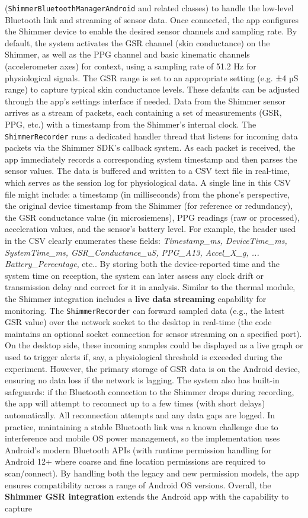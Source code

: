 (\texttt{ShimmerBluetoothManagerAndroid} and related classes) to handle the low-level Bluetooth link and streaming of sensor data. Once connected, the app configures the Shimmer device to enable the desired sensor channels and sampling rate. By default, the system activates the GSR channel (skin conductance) on the Shimmer, as well as the PPG channel and basic kinematic channels (accelerometer axes) for context, using a sampling rate of 51.2 Hz for physiological signals. The GSR range is set to an appropriate setting (e.g. ±4 µS range) to capture typical skin conductance levels. These defaults can be adjusted through the app's settings interface if needed. Data from the Shimmer sensor arrives as a stream of packets, each containing a set of measurements (GSR, PPG, etc.) with a timestamp from the Shimmer's internal clock. The \texttt{ShimmerRecorder} runs a dedicated handler thread that listens for incoming data packets via the Shimmer SDK's callback system. As each packet is received, the app immediately records a corresponding system timestamp and then parses the sensor values. The data is buffered and written to a CSV text file in real-time, which serves as the session log for physiological data. A single line in this CSV file might include: a timestamp (in milliseconds) from the phone's perspective, the original device timestamp from the Shimmer (for reference or redundancy), the GSR conductance value (in microsiemens), PPG readings (raw or processed), acceleration values, and the sensor's battery level. For example, the header used in the CSV clearly enumerates these fields: \textit{Timestamp_ms, DeviceTime_ms, SystemTime_ms, GSR_Conductance_uS, PPG_A13, Accel_X_g, ... Battery_Percentage}, etc.. By storing both the device-reported time and the system time on reception, the system can later assess any clock drift or transmission delay and correct for it in analysis. Similar to the thermal module, the Shimmer integration includes a \textbf{live data streaming} capability for monitoring. The \texttt{ShimmerRecorder} can forward sampled data (e.g., the latest GSR value) over the network socket to the desktop in real-time (the code maintains an optional socket connection for sensor streaming on a specified port). On the desktop side, these incoming samples could be displayed as a live graph or used to trigger alerts if, say, a physiological threshold is exceeded during the experiment. However, the primary storage of GSR data is on the Android device, ensuring no data loss if the network is lagging. The system also has built-in safeguards: if the Bluetooth connection to the Shimmer drops during recording, the app will attempt to reconnect up to a few times (with short delays) automatically. All reconnection attempts and any data gaps are logged. In practice, maintaining a stable Bluetooth link was a known challenge due to interference and mobile OS power management, so the implementation uses Android's modern Bluetooth APIs (with runtime permission handling for Android 12+ where coarse and fine location permissions are required to scan/connect). By handling both the legacy and new permission models, the app ensures compatibility across a range of Android OS versions. Overall, the \textbf{Shimmer GSR integration} extends the Android app with the capability to capture 